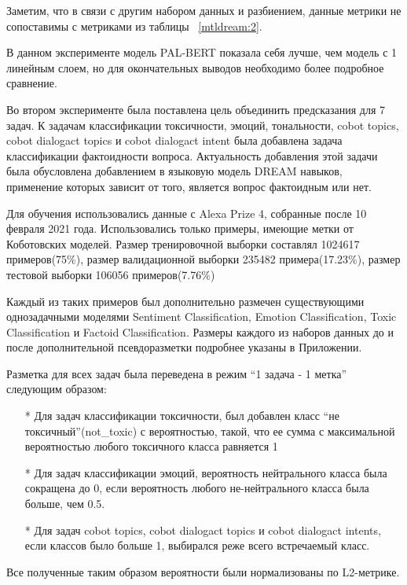 \begin{table}[htbp]
\centering
\caption {Accuracy(f1) с диалоговой историей для многозадачной модели с 1 линейным слоем, только Коботовские задачи}
\label{mtldream:3}%
\end{table}

Заметим, что в связи с другим набором данных и разбиением, данные метрики не сопоставимы с метриками из таблицы ~\ref{mtldream:2}.
 
В данном эксперименте модель PAL-BERT показала себя лучше, чем модель с 1 линейным слоем, но для окончательных выводов необходимо более подробное сравнение.

Во втором эксперименте была поставлена цель объединить предсказания для 7 задач. К задачам классификации токсичности, эмоций, тональности, cobot topics, cobot dialogact topics и cobot dialogact intent была добавлена задача классификации фактоидности вопроса. Актуальность добавления этой задачи была обусловлена добавлением в языковую модель DREAM навыков, применение которых зависит от того, является вопрос фактоидным или нет.

Для обучения использовались данные с Alexa Prize 4, собранные после 10 февраля 2021 года. Использовались только примеры, имеющие метки от Коботовских моделей. Размер тренировочной выборки составлял 1024617 примеров(75\%), размер валидационной выборки 235482 примера(17.23\%), размер тестовой выборки 106056 примеров(7.76\%)

Каждый из таких примеров был дополнительно размечен существующими однозадачными моделями Sentiment Classification, Emotion Classification, Toxic Classification и Factoid Classification. Размеры каждого из наборов данных до и после дополнительной псевдоразметки подробнее указаны в Приложении. 

Разметка для всех задач была переведена в режим “1 задача - 1 метка” следующим образом:
\begin{itemize}
\item[*] Для задач классификации токсичности, был добавлен класс “не токсичный”({not\_toxic}) с вероятностью, такой, что ее сумма с максимальной вероятностью любого токсичного класса равняется 1
\item[*] Для задач классификации эмоций, вероятность нейтрального класса была сокращена до 0, если вероятность любого не-нейтрального класса была больше, чем 0.5.
\item[*] Для задач cobot topics, cobot dialogact topics и cobot dialogact intents, если классов было больше 1, выбирался реже всего встречаемый класс.
\end{itemize}
Все полученные таким образом вероятности были нормализованы по L2-метрике.

